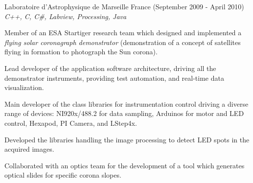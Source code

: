 \documentclass[alan.tex]{subfiles}
\begin{document}
  \item[Laboratoire d'Astrophysique de Marseille] France (September 2009 - April 2010)\\
  \emph{C++, C, C\#, Labview, Processing, Java}
  \begin{my_contractor}
  Member of an ESA Startiger research team which designed and implemented a \emph{flying solar coronagraph demonstrator} (demonstration of a concept of satellites flying in formation to photograph the Sun corona). 
    \begin{my_bullets}
      \item Lead developer of the application software architecture, driving all the demonstrator instruments, providing test automation, and real-time data visualization. 
      \item Main developer of the class libraries for instrumentation control driving a diverse range of devices: NI920x/488.2 for data sampling, Arduinos for motor and LED control, Hexapod, PI Camera, and LStep4x. 
      \item Developed the libraries handling the image processing to detect LED spots in the acquired images.
      \item Collaborated with an optics team for the development of a tool which generates optical slides for specific corona slopes. 
    \end{my_bullets}
  \end{my_contractor}
\end{document}
